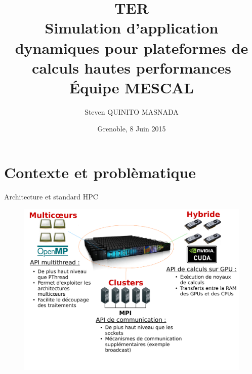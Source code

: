 \documentclass[11pt,xcolor=dvipsnames,presentation]{beamer}
\author{Steven QUINITO MASNADA}
\date{Grenoble, 8 Juin 2015}
\title{\textbf{TER} \\ Simulation d'application dynamiques pour plateformes de calculs hautes performances \bigskip\\ \large Équipe MESCAL}
\begin{document}
\maketitle

\section{Contexte et problèmatique}
\label{sec-1}
\begin{frame}[label=sec-1-1]{Architecture et standard HPC}
\begin{figure}[tbh]
\centering
\vspace{-1.5mm}
\includegraphics[width=\linewidth]{./Slides/Archi.pdf}
\end{figure}
\end{frame}
\end{document}
